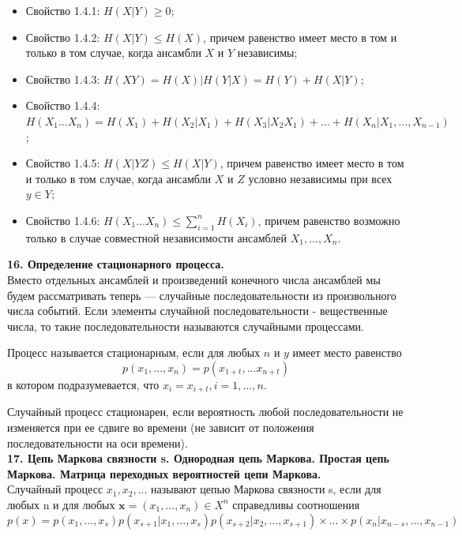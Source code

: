 \documentclass[14pt]{article}
\begin{document}
\begin{itemize}
    \item Свойство 1.4.1: \( H(X|Y) \geq 0 \);
    \item Свойство 1.4.2: \( H(X|Y) \leq H(X) \), причем равенство имеет место в том и только в том случае, когда ансамбли \(X\) и \(Y\) независимы;
    \item Свойство 1.4.3: \( H(XY) = H(X) | H(Y|X) = H(Y) + H(X|Y) \);
    \item Свойство 1.4.4: \( H(X_1...X_n) = H(X_1) + H(X_2|X_1) + H(X_3|X_2X_1) + ... + H(X_n|X_1,...,X_{n-1})\);
    \item Свойство 1.4.5: \( H(X|YZ) \leq H(X|Y) \), причем равенство имеет место в том и только в том случае, когда ансамбли \(X\) и \(Z\) условно независимы при всех \(y \in Y\);
    \item Свойство 1.4.6: \( H(X_1...X_n) \leq \displaystyle\sum_{i=1}^{n} H(X_i) \), причем равенство возможно только в случае совместной независимости ансамблей \(X_1,...,X_{n}\).
\end{itemize}

\bigskip
\textbf{16. Определение стационарного процесса.} \\

Вместо отдельных ансамблей и произведений конечного числа ансамблей мы будем рассматривать теперь — случайные последовательности из произвольного числа событий. Если элементы случайной последовательности - вещественные числа, то такие последовательности называются случайными процессами. 

Процесс называется стационарным, если для любых \(n\) и \(y\) имеет место равенство
\begin{displaymath}
    p(x_1,...,x_n)= p(x_{1+t},...x_{n+t})
\end{displaymath}
в котором подразумевается, что \( x_i = x_{i+t}, i = 1,...,n \).

Случайный процесс стационарен, если вероятность любой последовательности не изменяется при ее сдвиге во времени (не зависит от положения последовательности на оси времени). \\

\bigskip
\textbf{17. Цепь Маркова связности s. Однородная цепь Маркова. Простая цепь Маркова. Матрица
переходных вероятностей цепи Маркова.} \\

Случайный процесс \(x_1, x_2, ...\) называют цепью Маркова связности s, если для любых n и для любых \(\textbf{x} = (x_1,...,x_n) \in X^n\) справедливы соотношения
\begin{displaymath}
    p(x) = p(x_1,...,x_s)p(x_{s+1}|x_1,...,x_s)p(x_{s+2}|x_2,...,x_{s+1}) \times ... \times p(x_n|x_{n-s},...,x_{n-1})
\end{displaymath}
\end{document}
